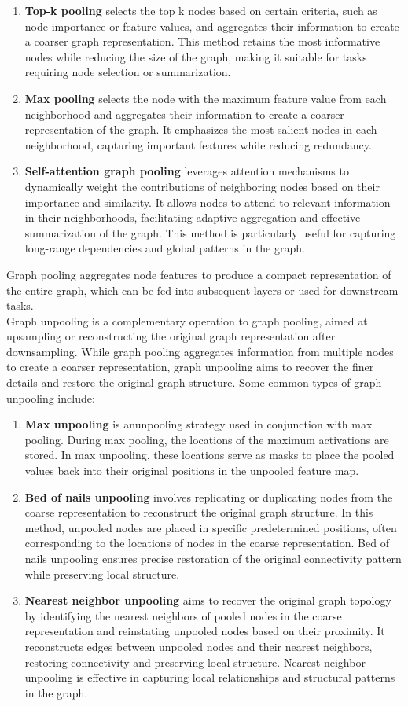 \begin{enumerate}
\item \textbf{Top-k pooling} selects the top k nodes based on certain criteria, such as node importance or feature values, and aggregates their information to create a coarser graph representation. This method retains the most informative nodes while reducing the size of the graph, making it suitable for tasks requiring node selection or summarization.
\item \textbf{Max pooling} selects the node with the maximum feature value from each neighborhood and aggregates their information to create a coarser representation of the graph. It emphasizes the most salient nodes in each neighborhood, capturing important features while reducing redundancy.
\item \textbf{Self-attention graph pooling} leverages attention mechanisms to dynamically weight the contributions of neighboring nodes based on their importance and similarity. It allows nodes to attend to relevant information in their neighborhoods, facilitating adaptive aggregation and effective summarization of the graph. This method is particularly useful for capturing long-range dependencies and global patterns in the graph.
\end{enumerate}
Graph pooling aggregates node features to produce a compact representation of the entire graph, which can be fed into subsequent layers or used for downstream tasks. \\
Graph unpooling is a complementary operation to graph pooling, aimed at upsampling or reconstructing the original graph representation after downsampling. While graph pooling aggregates information from multiple nodes to create a coarser representation, graph unpooling aims to recover the finer details and restore the original graph structure. Some common types of graph unpooling include:
\begin{enumerate}
\item \textbf{Max unpooling} is anunpooling strategy used in conjunction with max pooling. During max pooling, the locations of the maximum activations are stored. In max unpooling, these locations serve as masks to place the pooled values back into their original positions in the unpooled feature map.
\item \textbf{Bed of nails unpooling} involves replicating or duplicating nodes from the coarse representation to reconstruct the original graph structure. In this method, unpooled nodes are placed in specific predetermined positions, often corresponding to the locations of nodes in the coarse representation. Bed of nails unpooling ensures precise restoration of the original connectivity pattern while preserving local structure.
\item \textbf{Nearest neighbor unpooling} aims to recover the original graph topology by identifying the nearest neighbors of pooled nodes in the coarse representation and reinstating unpooled nodes based on their proximity. It reconstructs edges between unpooled nodes and their nearest neighbors, restoring connectivity and preserving local structure. Nearest neighbor unpooling is effective in capturing local relationships and structural patterns in the graph.
\end{enumerate}
